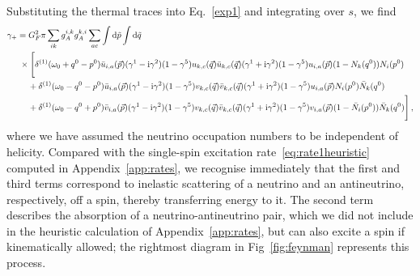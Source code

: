 \documentclass[aps,prd,10pt,twocolumn,superscriptaddress,floatfix,nofootinbib,amsmath,amssymb,altaffilletter,preprintnumbers]{revtex4-1}
\begin{document}
Substituting the thermal traces into Eq.~\eqref{exp1} and integrating over $s$, we find 
\begin{equation}
 \begin{aligned}
\gamma_{+}& =  G_F^2\pi \sum_{ik} g_A^{i,k} g_A^{k,i} 
    \sum_{ac}  
    \int {\rm d}\tilde{p} \int {\rm d} \tilde{q}  \\
    & \;\times \Bigg[\delta^{(1)}(\omega_0+q^0-p^0)
    \bar{u}_{i,a}(\vec{p})  (\gamma^1- {\rm i} \gamma^2) (1-\gamma^5) u_{k,c}(\vec{q}) 
    \bar{u}_{k,c}(\vec{q}) (\gamma^1+ {\rm i} \gamma^2)(1-\gamma^5) u_{i,a}(\vec{p}) (1- N_k(q^0))N_i(p^0) \\
    &\quad \;+\delta^{(1)}(\omega_0-q^0-p^0)
    \bar{u}_{i,a}(\vec{p})  (\gamma^1- {\rm i} \gamma^2)(1-\gamma^5) v_{k,c}(\vec{q}) 
    \bar{v}_{k,c}(\vec{q}) (\gamma^1+ {\rm i} \gamma^2)(1-\gamma^5) u_{i,a}(\vec{p})N_i(p^0)\bar{N}_k(q^0)\\
    & \quad\; +\delta^{(1)}(\omega_0-q^0+p^0)
    \bar{v}_{i,a}(\vec{p})  (\gamma^1- {\rm i} \gamma^2)
    (1-\gamma^5) v_{k,c}(\vec{q}) 
    \bar{v}_{k,c}(\vec{q}) (\gamma^1+ {\rm i} \gamma^2)(1-\gamma^5) v_{i,a}(\vec{p}) (1- \bar{N}_i(p^0))\bar{N}_k(q^0) \Bigg]\,,
    \label{exp2}
\end{aligned}
\end{equation}
where we have assumed the neutrino occupation numbers to be independent of helicity. Compared with the single-spin excitation rate~\eqref{eq:rate1heuristic} computed in Appendix~\ref{app:rates}, we recognise immediately that the first and third terms correspond to inelastic scattering of a neutrino and an antineutrino, respectively, off a spin, thereby transferring energy to it.
The second term describes the absorption of a neutrino-antineutrino pair, which we did not include in the heuristic calculation of Appendix~\ref{app:rates}, but can also excite a spin if kinematically allowed; the rightmost diagram in Fig~\ref{fig:feynman} represents this process. 
\end{document}
